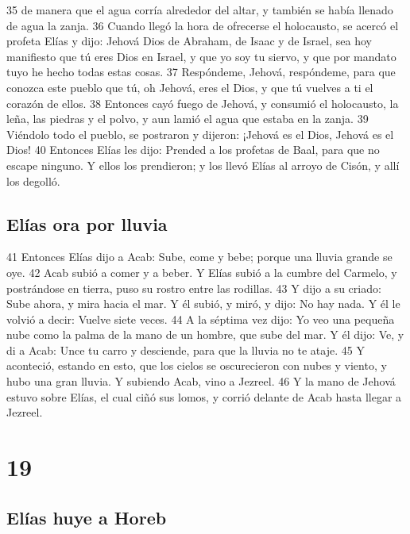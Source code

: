 35 de manera que el agua corría alrededor del altar, y también se había llenado de agua la zanja.
36 Cuando llegó la hora de ofrecerse el holocausto, se acercó el profeta Elías y dijo: Jehová Dios de Abraham, de Isaac y de Israel, sea hoy manifiesto que tú eres Dios en Israel, y que yo soy tu siervo, y que por mandato tuyo he hecho todas estas cosas.
37 Respóndeme, Jehová, respóndeme, para que conozca este pueblo que tú, oh Jehová, eres el Dios, y que tú vuelves a ti el corazón de ellos.
38 Entonces cayó fuego de Jehová, y consumió el holocausto, la leña, las piedras y el polvo, y aun lamió el agua que estaba en la zanja.
39 Viéndolo todo el pueblo, se postraron y dijeron: ¡Jehová es el Dios, Jehová es el Dios!
40 Entonces Elías les dijo: Prended a los profetas de Baal, para que no escape ninguno. Y ellos los prendieron; y los llevó Elías al arroyo de Cisón, y allí los degolló.
\section*{Elías ora por lluvia}

41 Entonces Elías dijo a Acab: Sube, come y bebe; porque una lluvia grande se oye.
42 Acab subió a comer y a beber. Y Elías subió a la cumbre del Carmelo, y postrándose en tierra, puso su rostro entre las rodillas.
43 Y dijo a su criado: Sube ahora, y mira hacia el mar. Y él subió, y miró, y dijo: No hay nada. Y él le volvió a decir: Vuelve siete veces.
44 A la séptima vez dijo: Yo veo una pequeña nube como la palma de la mano de un hombre, que sube del mar. Y él dijo: Ve, y di a Acab: Unce tu carro y desciende, para que la lluvia no te ataje.
45 Y aconteció, estando en esto, que los cielos se oscurecieron con nubes y viento, y hubo una gran lluvia. Y subiendo Acab, vino a Jezreel.
46 Y la mano de Jehová estuvo sobre Elías, el cual ciñó sus lomos, y corrió delante de Acab hasta llegar a Jezreel. 

\chapter{19}

\section*{Elías huye a Horeb}


